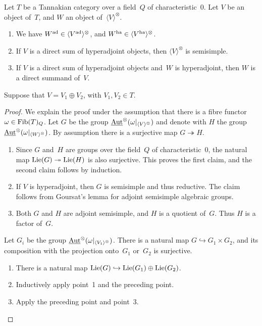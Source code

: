 \documentclass[10pt,twoside,leqno]{article}
\numberwithin{equation}{subsection}
\newcommand{\into}{\hookrightarrow}
\newcommand{\onto}{\twoheadrightarrow}
\newcommand{\Aut}{\textnormal{Aut}}
\newcommand{\iAut}{\underline{\Aut}}
\newcommand{\ZZ}{\mathbb{Z}}
\newcommand{\Lie}{\textnormal{Lie}}
\newcommand{\ad}{\textnormal{ad}}
\newcommand{\ha}{\textnormal{ha}}
\newcommand{\Fib}{\textnormal{Fib}}
\newcommand{\Tangen}[1]{\langle #1 \rangle^{\otimes}}
\begin{document}
\begin{lemma} %
 \label{ha-props}
 Let $T$ be a Tannakian category over a field~$Q$ of characteristic~$0$.
 Let $V$ be an object of~$T$, and $W$ an object of~$\Tangen{V}$.
 \begin{enumerate}
  \item We have $W^\ad \in \Tangen{V^\ad}$, and $W^\ha \in \Tangen{V^\ha}$.
  \item If $V$ is a direct sum of hyperadjoint objects,
   then $\Tangen{V}$ is semisimple.
  \item If $V$ is a direct sum of hyperadjoint objects
   and~$W$ is hyperadjoint, then $W$ is a direct summand of~$V$.
 \end{enumerate}
  Suppose that $V = V_1 \oplus V_2$, with $V_1,V_2 \in T$.
 \begin{proof}
  We explain the proof under the assumption
  that there is a fibre functor $\omega \in \Fib(T)_Q$.
  Let $G$ be the group $\iAut^\otimes(\omega|_{\Tangen{V}})$
  and denote with $H$ the group $\iAut^\otimes(\omega|_{\Tangen{W}})$.
  By assumption there is a surjective map $G \onto H$.
  \begin{enumerate}
   \item Since $G$ and~$H$ are groups over the field~$Q$ of characteristic~$0$,
    the natural map $\Lie(G) \onto \Lie(H)$ is also surjective.
    This proves the first claim, and the second claim follows by induction.
   \item If $V$ is hyperadjoint, then $G$ is semisimple and thus reductive.
    The claim follows from Goursat's lemma %
    for adjoint semisimple algebraic groups.
   \item Both $G$ and $H$ are adjoint semisimple, and $H$ is a quotient of~$G$.
    Thus $H$ is a factor of~$G$.
  \end{enumerate}
  Let $G_i$ be the group $\iAut^\otimes(\omega|_{\Tangen{V_1}})$.
  There is a natural map $G \into G_1 \times G_2$,
  and its composition with the projection onto~$G_1$ or~$G_2$ is surjective.
  \begin{enumerate}[resume]
   \item There is a natural map $\Lie(G) \into \Lie(G_1) \oplus \Lie(G_2)$.
   \item Inductively apply point~1 and the preceding point.
   \item Apply the preceding point and point~3.
  \end{enumerate}
 \end{proof}
\end{lemma}
\end{document}
